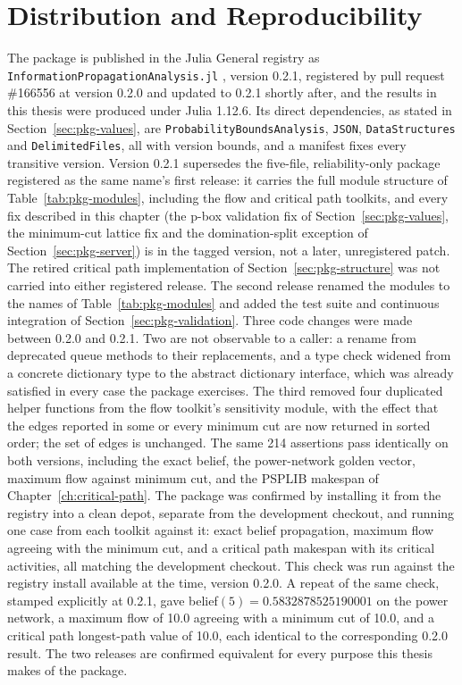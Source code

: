 \documentclass[12pt]{report}
\begin{document}
\section{Distribution and Reproducibility}
\label{sec:pkg-distribution}

The package is published in the Julia General registry as
\texttt{InformationPropagationAnalysis.jl} \cite{juliageneral}, version 0.2.1, registered by
pull request \#166556 at version 0.2.0 and updated to 0.2.1 shortly after, and the results
in this thesis were produced under Julia 1.12.6. Its direct dependencies, as stated in
Section~\ref{sec:pkg-values}, are \texttt{ProbabilityBoundsAnalysis}, \texttt{JSON},
\texttt{DataStructures} and \texttt{DelimitedFiles}, all with version bounds, and a
manifest fixes every transitive version. Version 0.2.1 supersedes the five-file,
reliability-only package registered as the same name's first release: it carries the full
module structure of Table~\ref{tab:pkg-modules}, including the flow and critical path
toolkits, and every fix described in this chapter (the p-box validation fix of
Section~\ref{sec:pkg-values}, the minimum-cut lattice fix and the domination-split
exception of Section~\ref{sec:pkg-server}) is in the tagged version, not a later,
unregistered patch. The retired critical path implementation of
Section~\ref{sec:pkg-structure} was not carried into either registered release. The second
release renamed the modules to the names of Table~\ref{tab:pkg-modules} and added the test
suite and continuous integration of Section~\ref{sec:pkg-validation}. Three code changes were made between 0.2.0 and 0.2.1. Two are not observable to a caller:
a rename from deprecated queue methods to their replacements, and a type check widened from
a concrete dictionary type to the abstract dictionary interface, which was already satisfied
in every case the package exercises. The third removed four duplicated helper functions
from the flow toolkit's sensitivity module, with the effect that the edges reported in some
or every minimum cut are now returned in sorted order; the set of edges is unchanged. The same 214 assertions pass
identically on both versions, including the exact belief, the power-network golden vector,
maximum flow against minimum cut, and the PSPLIB makespan of Chapter~\ref{ch:critical-path}.
The package was confirmed by installing it
from the registry into a clean depot, separate from the development checkout, and running
one case from each toolkit against it: exact belief propagation, maximum flow agreeing with
the minimum cut, and a critical path makespan with its critical activities, all matching the
development checkout. This check was run against the registry install available at the
time, version 0.2.0. A repeat of the same check, stamped explicitly at 0.2.1, gave
belief$(5) = 0.5832878525190001$ on the power network, a maximum flow of 10.0 agreeing with
a minimum cut of 10.0, and a critical path longest-path value of 10.0, each identical to the
corresponding 0.2.0 result. The two releases are confirmed equivalent for every purpose
this thesis makes of the package.
\end{document}
